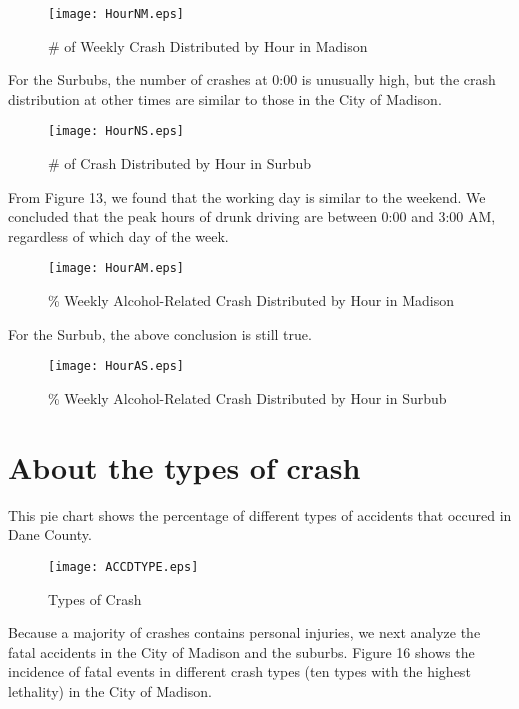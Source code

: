 \documentclass[10pt]{article}
\begin{document}
\begin{figure}[H]
\flushleft
\texttt{[image: HourNM.eps]}
\caption{\# of Weekly Crash Distributed by Hour in Madison}
\label{11}
\end{figure}

\newpage
For the Surbubs, the number of crashes at 0:00 is unusually high, but the crash distribution at other times are similar to those in the City of Madison. 

\begin{figure}[H]
\flushleft
\texttt{[image: HourNS.eps]}
\caption{\# of Crash Distributed by Hour in Surbub}
\label{12}
\end{figure}

\newpage
From Figure 13, we found that the working day is similar to the weekend. We concluded that the peak hours of drunk driving are between 0:00 and 3:00 AM, regardless of which day of the week.

\begin{figure}[H]
\flushleft
\texttt{[image: HourAM.eps]}
\caption{\% Weekly Alcohol-Related Crash Distributed by Hour in Madison}
\label{13}
\end{figure}

\newpage
For the Surbub, the above conclusion is still true.

\begin{figure}[H]
\flushleft
\texttt{[image: HourAS.eps]}
\caption{\% Weekly Alcohol-Related Crash Distributed by Hour in Surbub}
\label{14}
\end{figure}

\newpage
\section{About the types of crash}

This pie chart shows the percentage of different types of accidents that occured in Dane County.

\begin{figure}[H]
\flushleft
\texttt{[image: ACCDTYPE.eps]}
\caption{Types of Crash}
\label{15}
\end{figure}

\newpage
Because a majority of crashes contains personal injuries, we next analyze the fatal accidents in the City of Madison and the suburbs.
Figure 16 shows the incidence of fatal events in different crash types (ten types with the highest lethality) in the City of Madison.
\end{document}
